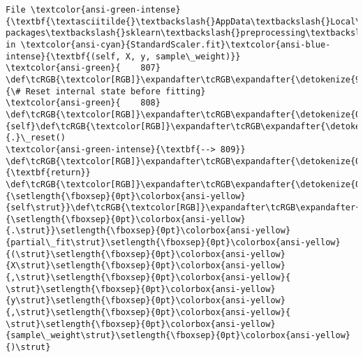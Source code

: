 \documentclass[11pt]{article}
\begin{document}
\begin{Verbatim}[commandchars=\\\{\}, frame=single, framerule=2mm, rulecolor=\color{outerrorbackground}]
File \textcolor{ansi-green-intense}{\textbf{\textasciitilde{}\textbackslash{}AppData\textbackslash{}Local\textbackslash{}Programs\textbackslash{}Python\textbackslash{}Python310\textbackslash{}lib\textbackslash{}site-packages\textbackslash{}sklearn\textbackslash{}preprocessing\textbackslash{}\_data.py:809}}, in \textcolor{ansi-cyan}{StandardScaler.fit}\textcolor{ansi-blue-intense}{\textbf{(self, X, y, sample\_weight)}}
\textcolor{ansi-green}{    807} \def\tcRGB{\textcolor[RGB]}\expandafter\tcRGB\expandafter{\detokenize{95,135,135}}{\# Reset internal state before fitting}
\textcolor{ansi-green}{    808} \def\tcRGB{\textcolor[RGB]}\expandafter\tcRGB\expandafter{\detokenize{0,135,0}}{self}\def\tcRGB{\textcolor[RGB]}\expandafter\tcRGB\expandafter{\detokenize{98,98,98}}{.}\_reset()
\textcolor{ansi-green-intense}{\textbf{--> 809}} \def\tcRGB{\textcolor[RGB]}\expandafter\tcRGB\expandafter{\detokenize{0,135,0}}{\textbf{return}} \def\tcRGB{\textcolor[RGB]}\expandafter\tcRGB\expandafter{\detokenize{0,135,0}}{\setlength{\fboxsep}{0pt}\colorbox{ansi-yellow}{self\strut}}\def\tcRGB{\textcolor[RGB]}\expandafter\tcRGB\expandafter{\detokenize{98,98,98}}{\setlength{\fboxsep}{0pt}\colorbox{ansi-yellow}{.\strut}}\setlength{\fboxsep}{0pt}\colorbox{ansi-yellow}{partial\_fit\strut}\setlength{\fboxsep}{0pt}\colorbox{ansi-yellow}{(\strut}\setlength{\fboxsep}{0pt}\colorbox{ansi-yellow}{X\strut}\setlength{\fboxsep}{0pt}\colorbox{ansi-yellow}{,\strut}\setlength{\fboxsep}{0pt}\colorbox{ansi-yellow}{ \strut}\setlength{\fboxsep}{0pt}\colorbox{ansi-yellow}{y\strut}\setlength{\fboxsep}{0pt}\colorbox{ansi-yellow}{,\strut}\setlength{\fboxsep}{0pt}\colorbox{ansi-yellow}{ \strut}\setlength{\fboxsep}{0pt}\colorbox{ansi-yellow}{sample\_weight\strut}\setlength{\fboxsep}{0pt}\colorbox{ansi-yellow}{)\strut}


\end{Verbatim}
\end{document}
